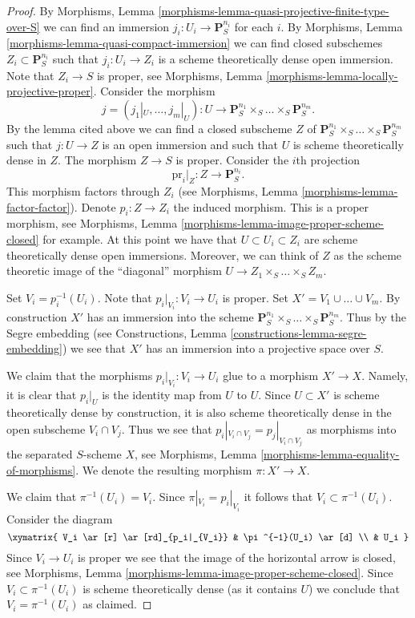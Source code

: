 \begin{proof}
\medskip\noindent
By Morphisms, Lemma \ref{morphisms-lemma-quasi-projective-finite-type-over-S}
we can find an immersion $j_i : U_i \to \mathbf{P}_S^{n_i}$
for each $i$. By
Morphisms, Lemma \ref{morphisms-lemma-quasi-compact-immersion} we can find
closed subschemes $Z_i \subset \mathbf{P}_S^{n_i}$
such that $j_i : U_i \to Z_i$ is a scheme theoretically
dense open immersion. Note that $Z_i \to S$ is proper, see
Morphisms, Lemma \ref{morphisms-lemma-locally-projective-proper}.
Consider the morphism
$$
j = (j_1|_U, \ldots, j_m|_U) : U \longrightarrow
\mathbf{P}_S^{n_1} \times_S \ldots \times_S \mathbf{P}_S^{n_m}.
$$
By the lemma cited above we can find a closed subscheme
$Z$ of $\mathbf{P}_S^{n_1} \times_S \ldots \times_S \mathbf{P}_S^{n_m}$
such that $j : U \to Z$ is an open immersion and such that $U$
is scheme theoretically dense in $Z$. The morphism $Z \to S$
is proper. Consider the $i$th projection
$$
\text{pr}_i|_Z : Z \longrightarrow \mathbf{P}^{n_i}_S.
$$
This morphism factors through $Z_i$ (see Morphisms,
Lemma \ref{morphisms-lemma-factor-factor}). Denote $p_i : Z \to Z_i$
the induced morphism. This is a proper morphism, see
Morphisms, Lemma \ref{morphisms-lemma-image-proper-scheme-closed}
for example. At this point we have that
$U \subset U_i \subset Z_i$ are scheme theoretically
dense open immersions. Moreover, we can think of $Z$ as the
scheme theoretic image of the ``diagonal'' morphism
$U \to Z_1 \times_S \ldots \times_S Z_m$.

\medskip\noindent
Set $V_i = p_i^{-1}(U_i)$. Note that $p_i|_{V_i} : V_i \to U_i$ is proper.
Set $X' = V_1 \cup \ldots \cup V_m$. By construction $X'$ has an immersion
into the scheme
$\mathbf{P}^{n_1}_S \times_S \ldots \times_S \mathbf{P}^{n_m}_S$.
Thus by the Segre embedding (see
Constructions, Lemma \ref{constructions-lemma-segre-embedding})
we see that $X'$ has
an immersion into a projective space over $S$.

\medskip\noindent
We claim that the morphisms $p_i|_{V_i}: V_i \to U_i$ glue to a morphism
$X' \to X$. Namely, it is clear that $p_i|_U$ is the identity map
from $U$ to $U$. Since $U \subset X'$ is scheme theoretically
dense by construction, it is also scheme theoretically dense
in the open subscheme $V_i \cap V_j$. Thus we see that
$p_i|_{V_i \cap V_j} = p_j|_{V_i \cap V_j}$ as morphisms into the
separated $S$-scheme $X$, see
Morphisms, Lemma \ref{morphisms-lemma-equality-of-morphisms}.
We denote the resulting morphism $\pi : X' \to X$.

\medskip\noindent
We claim that $\pi^{-1}(U_i) = V_i$.
Since $\pi|_{V_i} = p_i|_{V_i}$ it follows that
$V_i \subset \pi^{-1}(U_i)$. Consider the diagram
$$
\xymatrix{
V_i \ar[r] \ar[rd]_{p_i|_{V_i}} & \pi^{-1}(U_i) \ar[d] \\
& U_i
}
$$
Since $V_i \to U_i$ is proper we see that the image of
the horizontal arrow is closed, see
Morphisms, Lemma \ref{morphisms-lemma-image-proper-scheme-closed}.
Since $V_i \subset \pi^{-1}(U_i)$ is scheme
theoretically dense (as it contains $U$)
we conclude that $V_i = \pi^{-1}(U_i)$ as claimed.


\end{proof}
